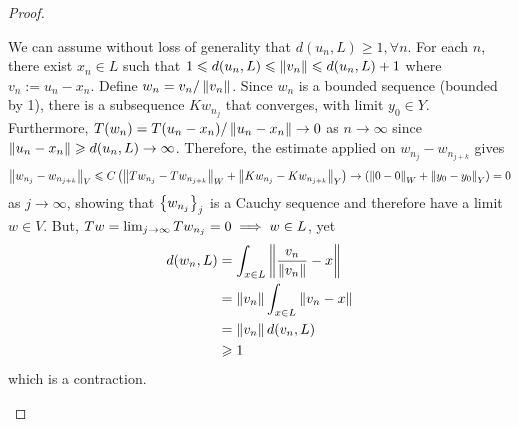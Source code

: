 \documentclass{article}
\begin{document}
\begin{ftheorem}
\begin{proof}
\begin{case} We can assume without loss of generality that $d(u_n, L) \geq 1, \forall n$. For each $n$, there exist $x_n \in L$ such that $1 \leq d(u_n, L) \leq \norm[v_n] \leq d(u_n, L) + 1$ where $v_n := u_n - x_n$. Define $w_n = v_n / \norm[v_n]$. Since $w_n$ is a bounded sequence (bounded by 1), there is a subsequence $Kw_{n_j}$ that converges, with limit $y_0 \in Y$. Furthermore, $T(w_n) = T(u_n - x_n) / \norm[u_n - x_n] \to 0$ as $n \to \infty$ since $\norm[u_n - x_n] \geq d(u_n, L) \to \infty$. Therefore, the estimate applied on $w_{n_j} - w_{n_{j + k}}$ gives
\begin{align*}
\norm[w_{n_j} - w_{n_{j + k}}]_V \leq C \brac{\norm[Tw_{n_j} - Tw_{n_{j + k}}]_W + \norm[Kw_{n_j} - Kw_{n_{j + k}}]_Y} \to  \brac{\norm[0 - 0]_W + \norm[y_0 - y_0]_Y} = 0 
\end{align*}
as $j \to \infty$, showing that $\set{w_{n_j}}_j$ is a Cauchy sequence and therefore have a limit $w \in V$. But, $Tw = \Lim[j] Tw_{n_j} = 0 \implies w \in L$, yet 
\begin{align*}
d(w_n, L) 
&= \int_{x \in L} \norm[\frac{v_n}{\norm[v_n]} - x] \\
&= \norm[v_n] \int_{x \in L} \norm[v_n - x] \\
&= \norm[v_n] d(v_n, L) \\
&\geq 1
\end{align*}
which is a contraction. 
\end{case}




\end{proof}
\end{ftheorem}





\end{document}
